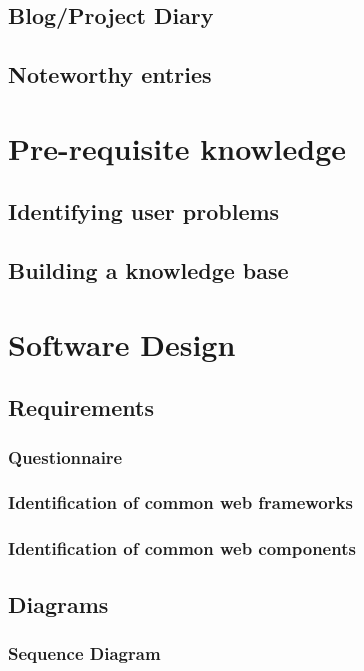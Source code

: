 \subsection{Blog/Project Diary}

\subsection{Noteworthy entries}

\section{Pre-requisite knowledge}
\subsection{Identifying user problems}

\subsection{Building a knowledge base}

\section{Software Design}
\subsection{Requirements}
\subsubsection{Questionnaire}

\subsubsection{Identification of common web frameworks}
\subsubsection{Identification of common web components}
\subsection{Diagrams}
\subsubsection{Sequence Diagram}

